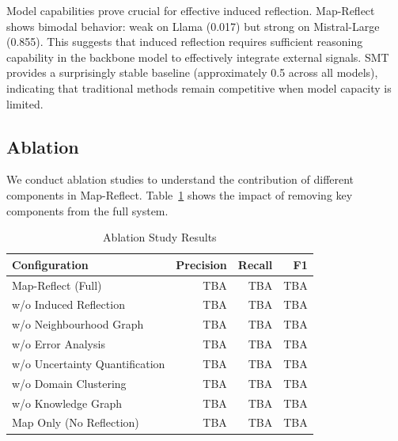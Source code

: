 \documentclass[sigconf, nonacm]{acmart}
\newcommand{\deleted}[1]{\textcolor{red}{#1}}
\begin{document}

Model capabilities prove crucial for effective induced reflection. Map-Reflect shows bimodal behavior: weak on Llama (0.017) but strong on Mistral-Large (0.855). This suggests that induced reflection requires sufficient reasoning capability in the backbone model to effectively integrate external signals. SMT provides a surprisingly stable baseline (approximately 0.5 across all models), indicating that traditional methods remain competitive when model capacity is limited.

\subsection{Ablation}

We conduct ablation studies to understand the contribution of different components in Map-Reflect. Table~\ref{tab:ablation_study} shows the impact of removing key components from the full system.

\begin{table}[htbp]
\centering
\begin{tabular}{lrrr}
\toprule
\textbf{Configuration} & \textbf{Precision} & \textbf{Recall} & \textbf{F1} \\
\midrule
Map-Reflect (Full) & TBA & TBA & TBA \\
w/o Induced Reflection & TBA & TBA & TBA \\
w/o Neighbourhood Graph & TBA & TBA & TBA \\
w/o Error Analysis & TBA & TBA & TBA \\
w/o Uncertainty Quantification & TBA & TBA & TBA \\
w/o Domain Clustering & TBA & TBA & TBA \\
w/o Knowledge Graph & TBA & TBA & TBA \\
Map Only (No Reflection) & TBA & TBA & TBA \\
\bottomrule
\end{tabular}
\caption{Ablation Study Results}
\label{tab:ablation_study}
\end{table}
\end{document}
